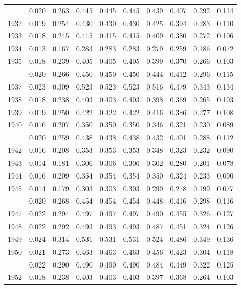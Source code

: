 \documentclass[
]{article}
\begin{document}
\begin{longtable}[t]{lrrrrrrrrr}
\endfoot
\bottomrule
\endlastfoot
1931 & 0.020 & 0.263 & 0.445 & 0.445 & 0.445 & 0.439 & 0.407 & 0.292 & 0.114\\
1932 & 0.019 & 0.254 & 0.430 & 0.430 & 0.430 & 0.425 & 0.394 & 0.283 & 0.110\\
1933 & 0.018 & 0.245 & 0.415 & 0.415 & 0.415 & 0.409 & 0.380 & 0.272 & 0.106\\
1934 & 0.013 & 0.167 & 0.283 & 0.283 & 0.283 & 0.279 & 0.259 & 0.186 & 0.072\\
1935 & 0.018 & 0.239 & 0.405 & 0.405 & 0.405 & 0.399 & 0.370 & 0.266 & 0.103\\
\addlinespace
1936 & 0.020 & 0.266 & 0.450 & 0.450 & 0.450 & 0.444 & 0.412 & 0.296 & 0.115\\
1937 & 0.023 & 0.309 & 0.523 & 0.523 & 0.523 & 0.516 & 0.479 & 0.343 & 0.134\\
1938 & 0.018 & 0.238 & 0.403 & 0.403 & 0.403 & 0.398 & 0.369 & 0.265 & 0.103\\
1939 & 0.019 & 0.250 & 0.422 & 0.422 & 0.422 & 0.416 & 0.386 & 0.277 & 0.108\\
1940 & 0.016 & 0.207 & 0.350 & 0.350 & 0.350 & 0.346 & 0.321 & 0.230 & 0.089\\
\addlinespace
1941 & 0.020 & 0.259 & 0.438 & 0.438 & 0.438 & 0.432 & 0.401 & 0.288 & 0.112\\
1942 & 0.016 & 0.208 & 0.353 & 0.353 & 0.353 & 0.348 & 0.323 & 0.232 & 0.090\\
1943 & 0.014 & 0.181 & 0.306 & 0.306 & 0.306 & 0.302 & 0.280 & 0.201 & 0.078\\
1944 & 0.016 & 0.209 & 0.354 & 0.354 & 0.354 & 0.350 & 0.324 & 0.233 & 0.090\\
1945 & 0.014 & 0.179 & 0.303 & 0.303 & 0.303 & 0.299 & 0.278 & 0.199 & 0.077\\
\addlinespace
1946 & 0.020 & 0.268 & 0.454 & 0.454 & 0.454 & 0.448 & 0.416 & 0.298 & 0.116\\
1947 & 0.022 & 0.294 & 0.497 & 0.497 & 0.497 & 0.490 & 0.455 & 0.326 & 0.127\\
1948 & 0.022 & 0.292 & 0.493 & 0.493 & 0.493 & 0.487 & 0.451 & 0.324 & 0.126\\
1949 & 0.024 & 0.314 & 0.531 & 0.531 & 0.531 & 0.524 & 0.486 & 0.349 & 0.136\\
1950 & 0.021 & 0.273 & 0.463 & 0.463 & 0.463 & 0.456 & 0.423 & 0.304 & 0.118\\
\addlinespace
1951 & 0.022 & 0.290 & 0.490 & 0.490 & 0.490 & 0.484 & 0.449 & 0.322 & 0.125\\
1952 & 0.018 & 0.238 & 0.403 & 0.403 & 0.403 & 0.397 & 0.368 & 0.264 & 0.103\\

\end{longtable}
\end{document}
